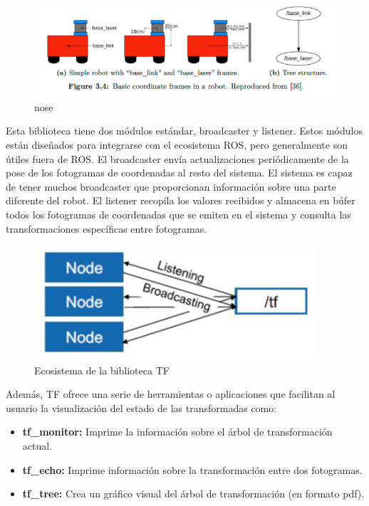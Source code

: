         \begin{figure}[htb]
            \centering
            \includegraphics[width=1.0\linewidth]{Main/Chapter3/Images3/3-6/estructura-arbol-tf.png}
            \caption{nose}
            \label{f:Cap3-6_nose1}
        \end{figure}    
        
                \newpage

        
        Esta biblioteca tiene dos módulos estándar, broadcaster y listener. Estos módulos están diseñados para integrarse con el ecosistema ROS, pero generalmente son útiles fuera de ROS. El broadcaster envía actualizaciones periódicamente de la pose de los fotogramas de coordenadas al resto del sistema. El sistema es capaz de tener muchos broadcaster que proporcionan información sobre una parte diferente del robot. El listener recopila los valores recibidos y almacena en búfer todos los fotogramas de coordenadas que se emiten en el sistema y consulta las transformaciones específicas entre fotogramas.

        \begin{figure}[htb]
            \centering
            \includegraphics[width=0.45\linewidth]{Main/Chapter3/Images3/3-6/esquema-funcionamiento-tf.png}
            \caption{Ecosistema de la biblioteca TF}
            \label{f:Cap3-6_ecosistema_tf}
        \end{figure}   
        
        Además, TF ofrece una serie de herramientas o aplicaciones que facilitan al usuario la visualización del estado de las transformadas como:
        
        \begin{itemize}
            \item \textbf{tf\_monitor:} Imprime la información sobre el árbol de transformación actual.
            \item \textbf{tf\_echo:} Imprime información sobre la transformación entre dos fotogramas.
            \item \textbf{tf\_tree:} Crea un gráfico visual del árbol de transformación (en formato pdf).
        \end{itemize}
        
